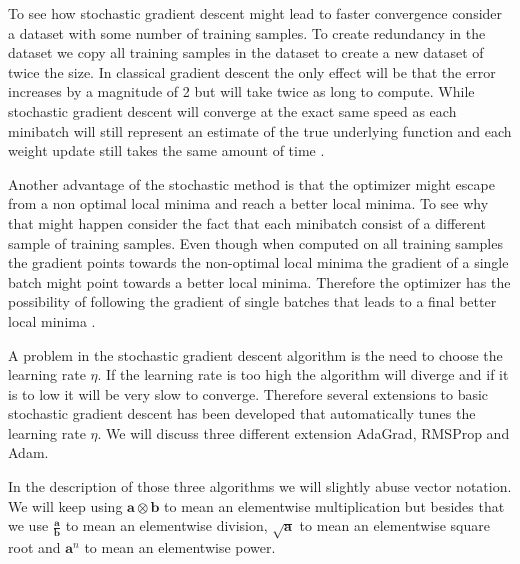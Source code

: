 To see how stochastic gradient descent might lead to faster convergence consider
a dataset with some number of training samples. To create redundancy in the
dataset we copy all training samples in the dataset to create a new dataset of
twice the size. In classical gradient descent the only effect will be that the
error increases by a magnitude of 2 but will take twice as long to compute.
While stochastic gradient descent will converge at the exact same speed as each
minibatch will still represent an estimate of the true underlying function and
each weight update still takes the same amount of time \citep{Bishop}.

Another advantage of the stochastic method is that the optimizer might escape
from a non optimal local minima and reach a better local minima. To see why that
might happen consider the fact that each minibatch consist of a different sample
of training samples. Even though when computed on all training samples the
gradient points towards the non-optimal local minima the gradient of a single
batch might point towards a better local minima. Therefore the optimizer has the
possibility of following the gradient of single batches that leads to a final
better local minima \citep{Bishop}.

A problem in the stochastic gradient descent algorithm is the need to choose
the learning rate $\eta$. If the learning rate is too high the algorithm
will diverge and if it is to low it will be very slow to converge. Therefore
several extensions to basic stochastic gradient descent has been developed that
automatically tunes the learning rate $\eta$. We will discuss three different
extension \gls{AdaGrad}, \gls{RMSProp} and \gls{Adam}.

In the description of those three algorithms we will slightly abuse
vector notation. We will keep using $\mathbf{a} \otimes \mathbf{b}$
to mean an elementwise multiplication but besides that we use
$\frac{\mathbf{a}}{\mathbf{b}}$ to mean an elementwise division,
$\sqrt{\mathbf{a}}$ to mean an elementwise square root and $\mathbf{a}^n$ to
mean an elementwise power.

